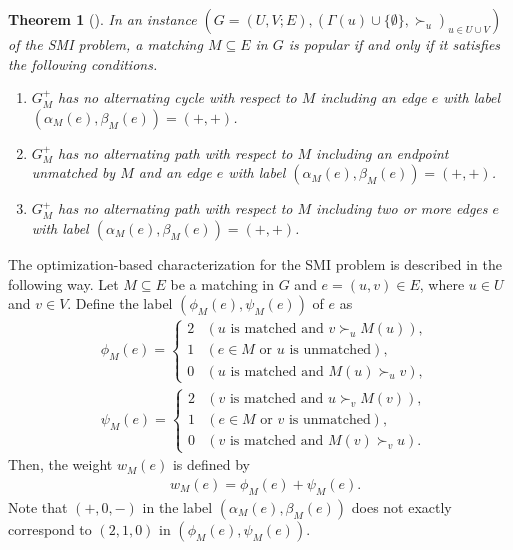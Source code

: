 \documentclass[11pt,a4paper,showkeys]{article}
\theoremstyle{plain}
\newtheorem{theorem}{Theorem}[section]
\theoremstyle{definition}
\begin{document}
\begin{theorem}[\cite{HK13}]
    \label{THMgraphSMI}
    In an instance $(G=(U,V;E),(\Gamma(u)\cup \{\emptyset\},\succ_u)_{u\in U\cup V})$ of the SMI problem, 
    a matching $M\subseteq E$ in $G$ is popular if and only if it satisfies the following conditions. 
    \begin{enumerate}
        \item $G_M^+$ has no alternating cycle with respect to $M$ including an edge $e$ with label $(\alpha_M(e),\beta_M(e))=(+,+)$. 
        \label{ENUgraphSMI1}
        \item $G_M^+$ has no alternating path with respect to $M$ including an endpoint unmatched by $M$ and an edge $e$ with label $(\alpha_M(e),\beta_M(e))=(+,+)$. 
        \label{ENUgraphSMI2}
        \item $G_M^+$ has no alternating path with respect to $M$ including two or more edges $e$ with label $(\alpha_M(e),\beta_M(e))=(+,+)$. 
        \label{ENUgraphSMI3}
    \end{enumerate}
\end{theorem}

The optimization-based characterization for the SMI problem  is described in the following way. 
Let $M\subseteq E$ be a matching in $G$ 
and $e=(u,v)\in E$, 
where $u\in U$ and $v\in V$. 
Define the label $(\phi_M(e), \psi_M(e))$ of $e$ as  
\begin{align}
    &{}\phi_M(e)=
    \begin{cases}
        2 & (\mbox{$u$ is matched and $v \succ_u M(u)$}),\\
        1 & (\mbox{$e\in M$ or $u$ is unmatched}),\\
        0 & (\mbox{$u$ is matched and $M(u) \succ_u v$}), 
    \end{cases}
    \label{EQweightSMI1}\\
    &{}\psi_M(e) = 
    \begin{cases}
        2 & (\mbox{$v$ is matched and $u \succ_v M(v)$}),\\
        1 & (\mbox{$e\in M$ or $v$ is unmatched}),\\
        0 & (\mbox{$v$ is matched and $M(v) \succ_v u$}). 
    \end{cases}
    \label{EQweightSMI2}
\end{align}
Then, 
the weight $w_M(e)$ is defined by 
\begin{align}
    &{}w_M(e) = \phi_M(e) + \psi_M(e). 
    \label{EQweightSMI3}
\end{align}
Note that 
$(+,0,-)$ in the label $(\alpha_M(e), \beta_M(e))$
does not exactly correspond to
$(2,1,0)$ in $(\phi_M(e), \psi_M(e))$. 
\end{document}
